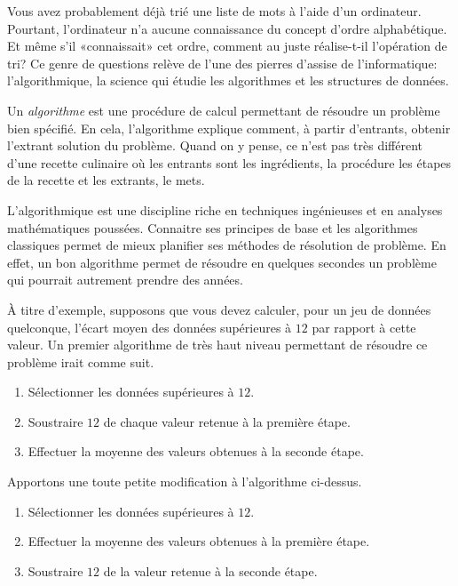 Vous avez probablement déjà trié une liste de mots à l'aide d'un
ordinateur. Pourtant, l'ordinateur n'a aucune connaissance du concept
d'ordre alphabétique. Et même s'il «connaissait» cet ordre, comment au
juste réalise-t-il l'opération de tri? Ce genre de questions relève de
l'une des pierres d'assise de l'informatique:
l'algorithmique, la science qui étudie les
algorithmes et les structures de données.

Un \emph{algorithme} est une procédure de calcul
permettant de résoudre un problème bien spécifié. En cela,
l'algorithme explique comment, à partir d'entrants, obtenir l'extrant
solution du problème. Quand on y pense, ce n'est pas très différent
d'une recette culinaire où les entrants sont les ingrédients, la
procédure les étapes de la recette et les extrants, le mets.

L'algorithmique est une discipline riche en techniques ingénieuses et
en analyses mathématiques poussées. Connaitre ses principes de base et
les algorithmes classiques permet de mieux planifier ses méthodes de
résolution de problème. En effet, un bon algorithme permet de résoudre
en quelques secondes un problème qui pourrait autrement prendre des
années.

À titre d'exemple, supposons que vous devez calculer, pour un jeu de
données quelconque, l'écart moyen des données supérieures à $12$ par
rapport à cette valeur. Un premier algorithme de très haut niveau
permettant de résoudre ce problème irait comme suit.

\begin{Schunk}
  \begin{enumerate}
  \item Sélectionner les données supérieures à $12$.
  \item Soustraire $12$ de chaque valeur retenue à la première étape.
  \item Effectuer la moyenne des valeurs obtenues à la seconde étape.
  \end{enumerate}
\end{Schunk}

Apportons une toute petite modification à l'algorithme ci-dessus.

\begin{Schunk}
  \begin{enumerate}
  \item Sélectionner les données supérieures à $12$.
  \item Effectuer la moyenne des valeurs obtenues à la première étape.
  \item Soustraire $12$ de la valeur retenue à la seconde étape.
  \end{enumerate}
\end{Schunk}

